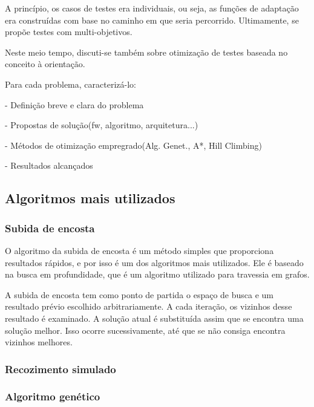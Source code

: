 A princípio, os casos de testes era individuais, ou seja, as funções de
adaptação era construídas com base no caminho em que seria percorrido.
Ultimamente, se propõe testes com multi-objetivos. 

Neste meio tempo, discuti-se também sobre otimização de testes baseada no
conceito à orientação. 


Para cada problema, caracterizá-lo:

- Definição breve e clara do problema

- Propostas de solução(fw, algoritmo, arquitetura...)

- Métodos de otimização empregrado(Alg. Genet., A*, Hill Climbing)

- Resultados alcançados

\subsection{Algoritmos mais utilizados}

\subsubsection{Subida de encosta}

O algoritmo da subida de encosta é um método simples que proporciona resultados rápidos, e por isso é um dos algoritmos mais utilizados. Ele é baseado na busca em profundidade, que é um algoritmo utilizado para travessia em grafos. 

A subida de encosta tem como ponto de partida o espaço de busca e um resultado prévio escolhido arbitrariamente. A cada iteração, os vizinhos desse resultado é examinado. A solução atual é substituída assim que se encontra uma solução melhor. Isso ocorre sucessivamente, até que se não consiga encontra vizinhos melhores.  

\subsubsection{Recozimento simulado}

\subsubsection{Algoritmo genético}








